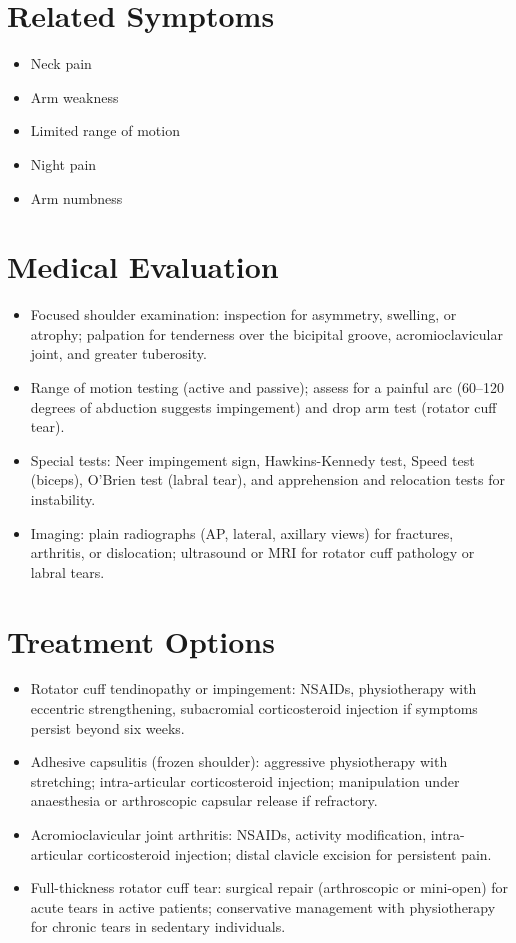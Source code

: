 \section*{Related Symptoms}
\begin{itemize}
  \item Neck pain
  \item Arm weakness
  \item Limited range of motion
  \item Night pain
  \item Arm numbness
\end{itemize}

\section*{Medical Evaluation}
\begin{itemize}
  \item Focused shoulder examination: inspection for asymmetry, swelling, or atrophy; palpation for tenderness over the bicipital groove, acromioclavicular joint, and greater tuberosity.
  \item Range of motion testing (active and passive); assess for a painful arc (60--120 degrees of abduction suggests impingement) and drop arm test (rotator cuff tear).
  \item Special tests: Neer impingement sign, Hawkins-Kennedy test, Speed test (biceps), O'Brien test (labral tear), and apprehension and relocation tests for instability.
  \item Imaging: plain radiographs (AP, lateral, axillary views) for fractures, arthritis, or dislocation; ultrasound or MRI for rotator cuff pathology or labral tears.
\end{itemize}

\section*{Treatment Options}
\begin{itemize}
  \item Rotator cuff tendinopathy or impingement: NSAIDs, physiotherapy with eccentric strengthening, subacromial corticosteroid injection if symptoms persist beyond six weeks.
  \item Adhesive capsulitis (frozen shoulder): aggressive physiotherapy with stretching; intra-articular corticosteroid injection; manipulation under anaesthesia or arthroscopic capsular release if refractory.
  \item Acromioclavicular joint arthritis: NSAIDs, activity modification, intra-articular corticosteroid injection; distal clavicle excision for persistent pain.
  \item Full-thickness rotator cuff tear: surgical repair (arthroscopic or mini-open) for acute tears in active patients; conservative management with physiotherapy for chronic tears in sedentary individuals.
\end{itemize}

